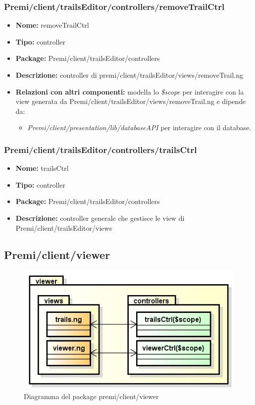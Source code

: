 \subsubsection{Premi/client/trailsEditor/controllers/removeTrailCtrl}
\begin{itemize}
  \item[] \textbf{Nome:} removeTrailCtrl
  \item[] \textbf{Tipo:} controller
  \item[] \textbf{Package:} Premi/client/trailsEditor/controllers
  \item[] \textbf{Descrizione:} controller di premi/client/trailsEditor/views/removeTrail.ng
  \item[] \textbf{Relazioni con altri componenti:} modella lo \textit{\$scope} per interagire con la view generata da Premi/client/trailsEditor/views/removeTrail.ng e dipende da:
  \begin{itemize}
  	\item \textit{Premi/client/presentation/lib/databaseAPI} per interagire con il database.
  \end{itemize}
\end{itemize}
\subsubsection{Premi/client/trailsEditor/controllers/trailsCtrl}
\begin{itemize}
  \item[] \textbf{Nome:} trailsCtrl
  \item[] \textbf{Tipo:} controller
  \item[] \textbf{Package:} Premi/client/trailsEditor/controllers
  \item[] \textbf{Descrizione:} controller generale che gestisce le view di Premi/client/trailsEditor/views
\end{itemize}

\subsection{Premi/client/viewer}
\begin{figure}[!h]
\begin{center}
\includegraphics[scale=0.45]{img/diapkg/viewer.png}
\caption{Diagramma del package premi/client/viewer}
\end{center}
\end{figure}
